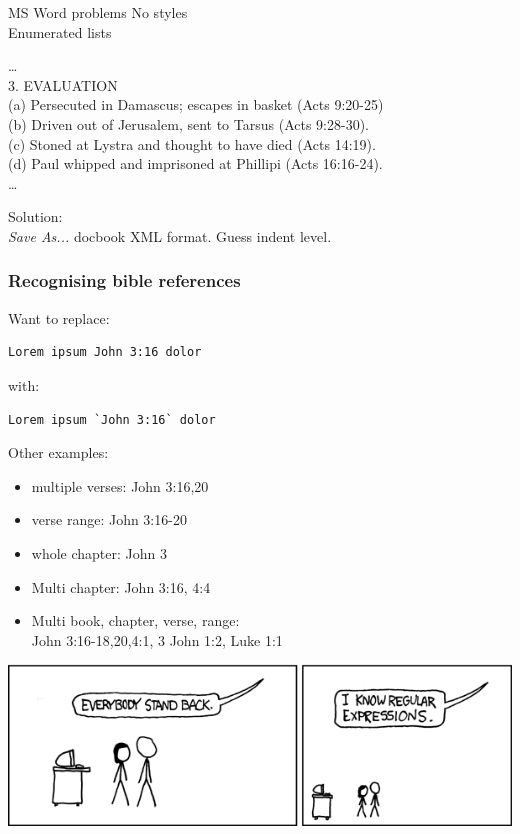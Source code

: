 \documentclass{beamer}
\begin{document}
    \begin{frame}{MS Word problems}
    No styles\\
        Enumerated lists
        \begin{framed} %
            \ldots\\
3. EVALUATION\\
\quad (a) Persecuted in Damascus; escapes in basket (Acts 9:20-25)\\
\quad (b) Driven out of Jerusalem, sent to Tarsus (Acts 9:28-30).\\
\quad (c) Stoned at Lystra and thought to have died (Acts 14:19).\\
        \quad (d) Paul whipped and imprisoned at Phillipi (Acts 16:16-24).\\
        \ldots
    \end{framed}
    Solution:\\
    \emph{Save As...} docbook XML format. Guess indent level.  
    \end{frame}
    
    \begin{frame}[fragile]
        \frametitle{Recognising bible references}
         Want to replace:\\
         \begin{verbatim}Lorem ipsum John 3:16 dolor
\end{verbatim}
         with:\\
         \begin{verbatim}Lorem ipsum `John 3:16` dolor
\end{verbatim}
Other examples:
\begin{itemize}
\item multiple verses: John 3:16,20
\item verse range: John 3:16-20
\item whole chapter: John 3
\item Multi chapter: John 3:16, 4:4
\item Multi book, chapter, verse, range:\\
    John 3:16-18,20,4:1, 3 John 1:2, Luke 1:1
\end{itemize}
\end{frame}

\begin{frame}
    \includegraphics[keepaspectratio=true, width=0.9\paperwidth]{regular_expressions.png}
\end{frame}
\end{document}
